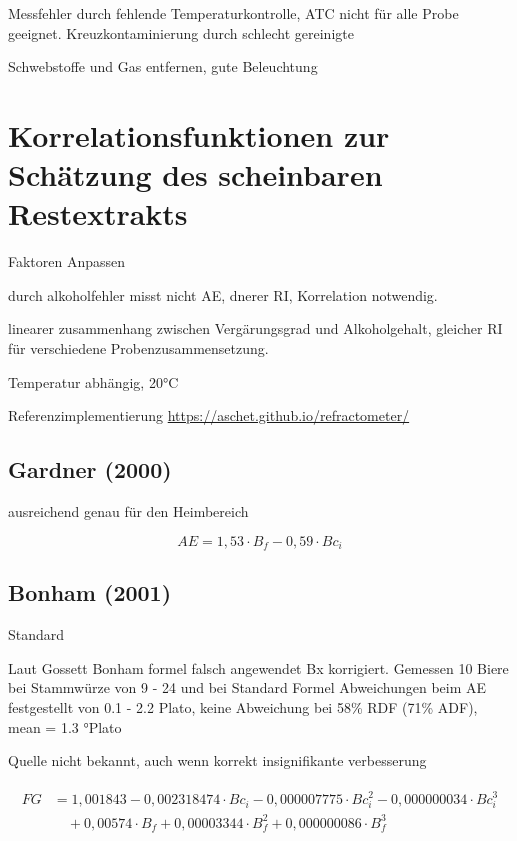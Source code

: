 \documentclass[a4paper,parskip=half]{scrartcl}
\newcommand{\bxic}{\mathit{Bc}_i}
\newcommand{\bxf}{\mathit{B}_f}
\newcommand{\fg}{\mathit{FG}}
\begin{document}
Messfehler durch fehlende Temperaturkontrolle, ATC nicht
für alle Probe geeignet.
Kreuzkontaminierung durch schlecht gereinigte
\autocite{Depalma2017}

Schwebstoffe und Gas entfernen, gute Beleuchtung
\autocite{Gamer1959}

\section*{Korrelationsfunktionen zur Schätzung des scheinbaren Restextrakts}

Faktoren Anpassen
\autocite{Gamer1959}

durch alkoholfehler misst nicht AE, dnerer RI, Korrelation notwendig.
\autocite{Terrill2010a}

linearer zusammenhang zwischen Vergärungsgrad und Alkoholgehalt,
gleicher RI für verschiedene Probenzusammensetzung.
\autocite{Terrill2010}

Temperatur abhängig, 20°C
\autocite{Gossett2012}

Referenzimplementierung \url{https://aschet.github.io/refractometer/}

\subsection*{Gardner (2000)}

ausreichend genau für den Heimbereich
\autocite{Bonham2001}

\begin{equation}
\mathit{AE}=1,53 \cdot \bxf - 0,59 \cdot \bxic
\label{eq:gardner} 
\end{equation}

\subsection*{Bonham (2001)}

Standard \autocite{Terrill2010a}

Laut Gossett Bonham formel falsch angewendet Bx korrigiert.
Gemessen 10 Biere bei Stammwürze von 9 - 24 und bei Standard Formel Abweichungen
beim AE festgestellt von 0.1 - 2.2 Plato, keine Abweichung bei
58\% RDF (71\% ADF), mean = 1.3 °Plato
\autocite{Terrill2010a}

Quelle nicht bekannt, auch wenn korrekt insignifikante verbesserung
\autocite{Terrill2011}

\autocite{Bonham2001}

\begin{align}
\begin{split}
\fg &= 1,001843 - 0,002318474 \cdot \bxic - 0,000007775 \cdot \bxic^2 -
0,000000034 \cdot \bxic^3 \\
& \quad + 0,00574 \cdot \bxf +
0,00003344 \cdot \bxf^2 + 0,000000086 \cdot \bxf^3
\end{split} \label{eq:bonham} 
\end{align}
\end{document}
